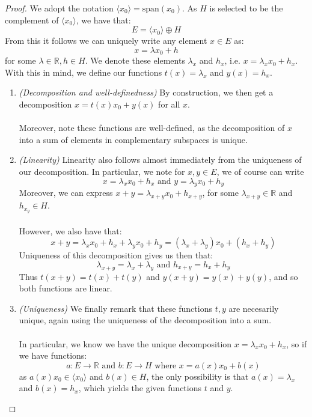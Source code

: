 \documentclass[12pt]{article}
\newenvironment{ex}[2][Exercise]{\begin{trivlist}
\item[\hskip \labelsep {\bfseries #1}\hskip \labelsep {\bfseries #2.}]}{\end{trivlist}}
\begin{document}
\begin{ex}{2}
\begin{enumerate}[label=(\alph*)]
        \begin{proof}
            We adopt the notation $\langle x_0 \rangle = \text{span}(x_0)$. As $H$ is selected to be the complement of $\langle x_0 \rangle$, we have that: $$E = \langle x_0 \rangle \oplus H$$ From this it follows we can uniquely write any element $x \in E$ as: $$x = \lambda x_0 + h$$ for some $\lambda \in \mathbb{R}, h \in H$. We denote these elements $\lambda_x$ and $h_x$, i.e. $x = \lambda_x x_0 + h_x$. With this in mind, we define our functions $t(x) = \lambda_x$ and $y(x) = h_x$.
            \begin{enumerate}[label=(\arabic*)]
            \item \textit{(Decomposition and well-definedness)}
            By construction, we then get a decomposition $x = t(x)x_0 + y(x)$ for all $x$. \\ \\Moreover, note these functions are well-defined, as the decomposition of $x$ into a sum of elements in complementary subspaces is unique.
            \item \textit{(Linearity)}
            Linearity also follows almost immediately from the uniqueness of our decomposition. In particular, we note for $x, y \in E$, we of course can write $$x = \lambda_x x_0 + h_x \text{ and } y = \lambda_y x_0 + h_y$$ Moreover, we can express $x + y = \lambda_{x+y}x_0 + h_{x + y}$, for some $\lambda_{x + y} \in \mathbb{R}$ and $h_{x_y} \in H$. \\ \\
            However, we also have that: $$x + y = \lambda_x x_0 + h_x + \lambda_y x_0 + h_y = (\lambda_x + \lambda_y)x_0 + (h_x + h_y)$$ Uniqueness of this decomposition gives us then that: $$\lambda_{x + y} = \lambda_{x} + \lambda_y \text{ and } h_{x + y} = h_x + h_y$$ Thus $t(x + y) = t(x) + t(y)$ and $y(x + y) = y(x) + y(y)$, and so both functions are linear. 
            \item \textit{(Uniqueness)}
            We finally remark that these functions $t, y$ are necesarily unique, again using the uniqueness of the decomposition into a sum. \\ \\
            In particular, we know we have the unique decomposition $x = \lambda_x x_0 + h_x$, so if we have functions: $$a : E \rightarrow \mathbb{R} \text{ and } b : E \rightarrow H \text{ where } x = a(x)x_0 + b(x)$$ as $a(x)x_0 \in \langle x_0 \rangle$ and $b(x) \in H$, the only possibility is that $a(x) = \lambda_x$ and $b(x) = h_x$, which yields the given functions $t$ and $y$.

\end{enumerate}
\end{proof}
\end{enumerate}
\end{ex}
\end{document}
